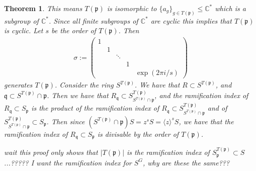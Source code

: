 \documentclass[11pt, a4paper, english]{article}
\numberwithin{prop}{section}
\numberwithin{lemma}{section}
\newtheorem{theorem}{Theorem}
\numberwithin{theorem}{section}
\numberwithin{defin}{section}
\numberwithin{example}{section}
\newcommand{\C}{\mathbb{C}}
\begin{document}
\begin{theorem}
This means $T(\mathfrak{p})$ is isomorphic to $\{ a_g \}_{g \in T(\mathfrak{p})} \leq \C^*$ which is a subgroup of $\C^*$. Since all finite subgroups of $\C^*$ are cyclic this implies that $T(\mathfrak{p})$ is cyclic. Let $s$ be the order of $T(\mathfrak{p})$. Then
\begin{align*}
\sigma :=
\begin{pmatrix}
1\\
& 1\\
&& \ddots\\
&&&1\\
&&&& \exp(2\pi i/s)
\end{pmatrix}
\end{align*}
generates $T(\mathfrak{p})$. Consider the ring $S^{T(\mathfrak{p})}$. We have that $R \subset S^{T(\mathfrak{p})}$, and $\mathfrak{q} \subset S^{T(\mathfrak{p})} \cap \mathfrak{p}$. Then we have that $R_\mathfrak{q} \subset S^{T(\mathfrak{p})}_{S^{T(\mathfrak{p})} \cap \mathfrak{p}}$, and the ramification index of $R_\mathfrak{q} \subset S_\mathfrak{p}$ is the product of the ramification index of $R_\mathfrak{q} \subset S^{T(\mathfrak{p})}_{S^{T(\mathfrak{p})} \cap \mathfrak{p}}$ and of $S^{T(\mathfrak{p})}_{S^{T(\mathfrak{p})} \cap \mathfrak{p}} \subset S_\mathfrak{p}$. Then since $(S^{T(\mathfrak{p})} \cap \mathfrak{p})S = z^s S = \langle z \rangle^s S$, we have that the ramification index of $R_\mathfrak{q} \subset S_\mathfrak{p}$ is divisable by the order of $T(\mathfrak{p})$.

{\color{red} wait this proof only shows that $|T(\mathfrak{p})|$ is the ramification index of $S^{T(\mathfrak{p})}_\mathfrak{p} \subset S$...????? I want the ramification index for $S^G$, why are these the same???}

\end{theorem}
\end{document}
